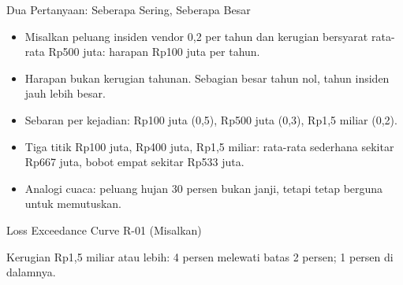 \documentclass[aspectratio=169, table, 12pt]{beamer}
\begin{document}
\begin{frame}{{\Large Dua Pertanyaan: Seberapa Sering, Seberapa Besar}}
  \vspace{6pt}
  \small
  \begin{itemize}
    \item Misalkan peluang insiden vendor 0,2 per tahun dan kerugian bersyarat rata-rata Rp500 juta:
          harapan Rp100 juta per tahun.
    \item Harapan bukan kerugian tahunan. Sebagian besar tahun nol, tahun insiden jauh lebih besar.
    \item Sebaran per kejadian: Rp100 juta (0,5), Rp500 juta (0,3), Rp1,5 miliar (0,2).
    \item Tiga titik Rp100 juta, Rp400 juta, Rp1,5 miliar: rata-rata sederhana sekitar Rp667 juta,
          bobot empat sekitar Rp533 juta.
    \item Analogi cuaca: peluang hujan 30 persen bukan janji, tetapi tetap berguna untuk memutuskan.
  \end{itemize}
\end{frame}

\begin{frame}{{\Large Loss Exceedance Curve R-01 (Misalkan)}}
  \centering
  \vspace{2pt}
  \resizebox{!}{0.72\textheight}{}

  \vspace{2pt}
  {\footnotesize Kerugian Rp1,5 miliar atau lebih: 4 persen melewati batas 2 persen; 1 persen di dalamnya.}
\end{frame}
\end{document}
